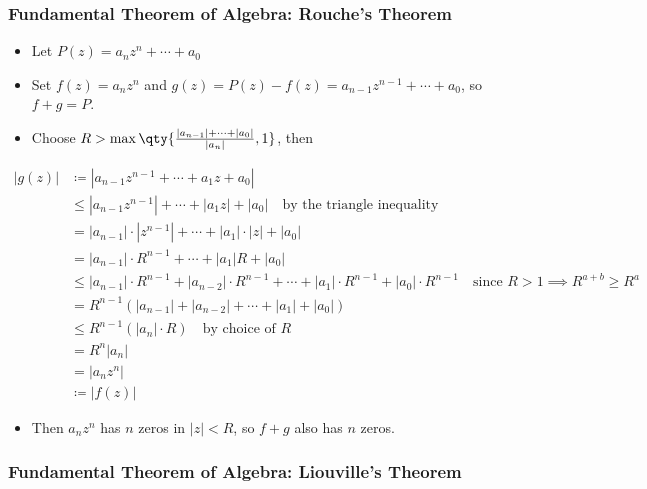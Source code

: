 \hypertarget{fundamental-theorem-of-algebra-rouches-theorem}{%
\subsubsection{Fundamental Theorem of Algebra: Rouche's
Theorem}\label{fundamental-theorem-of-algebra-rouches-theorem}}

\begin{itemize}
\tightlist
\item
  Let \(P(z) = a_nz^n + \cdots + a_0\)
\item
  Set \(f(z) = a_n z^n\) and
  \(g(z) = P(z) - f(z) = a_{n-1}z^{n-1} + \cdots + a_0\), so
  \(f+g = P\).
\item
  Choose
  \(R > \max\qty{ { {\left\lvert {a_{n-1}} \right\rvert} + \cdots + {\left\lvert {a_0} \right\rvert} \over {\left\lvert {a_n} \right\rvert} }, 1}\),
  then
\end{itemize}

\begin{align*} |g(z)|  &\coloneqq|a_{n-1}z^{n-1} + \cdots + a_1 z + a_0 | \\ &\leq |a_{n-1}z^{n-1}| + \cdots + |a_1 z| + |a_0 | \quad\text{by the triangle inequality} \\ &= |a_{n-1}|\cdot |z^{n-1}| + \cdots + |a_1|\cdot| z| + |a_0 | \\ &=  |a_{n-1}|\cdot R^{n-1} + \cdots + |a_1| R + |a_0 | \\ &\leq |a_{n-1}|\cdot R^{n-1}+|a_{n-2}|\cdot R^{n-1} + \cdots + |a_1| \cdot R^{n-1} + |a_0 |\cdot R^{n-1} \quad\text{since } R>1 \implies R^{a+b} \geq R^a \\ &= R^{n-1} \left( |a_{n-1}| + |a_{n-2}| + \cdots + |a_1| + |a_0| \right) \\ &\leq R^{n-1} \left( |a_n|\cdot R \right) \quad\text{by choice of } R   \\ &= R^{n} |a_n| \\ &= |a_n z^n| \\ &\coloneqq|f(z)| \end{align*}

\begin{itemize}
\tightlist
\item
  Then \(a_n z^n\) has \(n\) zeros in
  \({\left\lvert {z} \right\rvert} < R\), so \(f+g\) also has \(n\)
  zeros.
\end{itemize}

\hypertarget{fundamental-theorem-of-algebra-liouvilles-theorem}{%
\subsubsection{Fundamental Theorem of Algebra: Liouville's
Theorem}\label{fundamental-theorem-of-algebra-liouvilles-theorem}}

